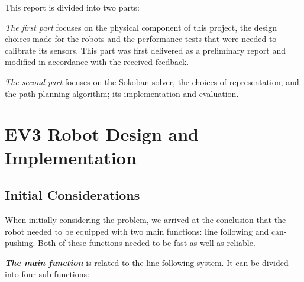 \documentclass[a4paper,12pt]{article}
\begin{document}
This report is divided into two parts:

\emph{The first part} focuses on the physical component of this project, the design  choices made for the robots and the performance tests that were needed to calibrate its sensors. This part was first delivered as a preliminary report and modified in accordance with the received feedback.

\emph{The second part} focuses on  the Sokoban solver, the choices of representation, and the path-planning algorithm; its implementation and evaluation.

\section{EV3 Robot Design and Implementation}
\subsection{Initial Considerations} %
When initially considering the problem, we arrived at the conclusion that the robot needed to be equipped with two main functions: line following and can-pushing. Both of these functions needed to be fast as well as reliable.

\textbf{\emph{The main function}} is related to the line following system. It can be divided into four sub-functions:

\end{document}
